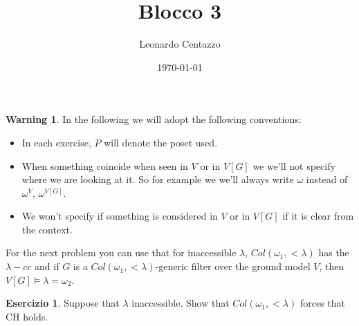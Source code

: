 \documentclass[a4paper,12pt]{article}
\title{Blocco 3}
\author{Leonardo Centazzo}
\date{\today}
\theoremstyle{plain}
\theoremstyle{definition}
\newtheorem{esercizio}{Esercizio}
\newtheorem*{warning}{Warning}
\theoremstyle{remark}
\begin{document}
\maketitle


\begin{warning}

	In the following we will adopt the following conventions: 
	\begin{itemize}
		\item In each exercise, $P$ will denote the poset used.
		\item When something coincide when seen in $V$ or in $V[G]$ we we'll not specify where we are looking at it.
			So for example we we'll always write $\omega$ instead of $\omega^{V}$, $\omega^{V[G]}$.
		\item We won't specify if something is considered in $V$ or in $V[G]$ if it is clear from the context.
	\end{itemize}

\end{warning}


For the next problem you can use that for inaccessible $\lambda$, $Col(\omega_1,<\lambda)$ has the $\lambda-cc$ and 
if $G$ is a $Col(\omega_1,<\lambda)$-generic filter over the ground model $V$, then $V[G] \models \lambda = \omega_2$.

\begin{esercizio}

	Suppose that $\lambda$ inaccessible. Show that $Col(\omega_1,<\lambda)$ forces that CH holds.
	
\end{esercizio}
\end{document}
